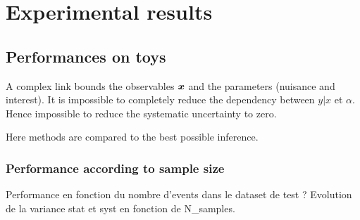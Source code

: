
\chapter{Experimental results}
\label{chap:xp}
\ifpdf
    \graphicspath{{Chapter5/Figs/Raster/}{Chapter5/Figs/PDF/}{Chapter5/Figs/}}
\else
    \graphicspath{{Chapter5/Figs/Vector/}{Chapter5/Figs/}}
\fi


\section{Performances on toys} %
\label{sec:performances_on_toys}


A complex link bounds the observables ${\bm{x}}$ and the parameters (nuisance and interest).
It is impossible to completely reduce the dependency between $y|x$ et $\alpha$.
Hence impossible to reduce the systematic uncertainty to zero.

Here methods are compared to the best possible inference.



\subsection{Performance according to sample size} %
\label{sub:performance_according_to_sample_size}


Performance en fonction du nombre d'events dans le dataset de test ?
Evolution de la variance stat et syst en fonction de N\_samples.


